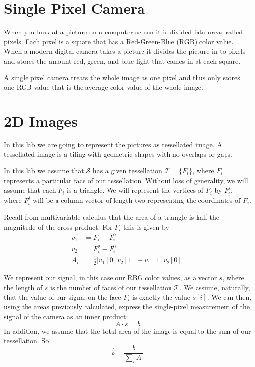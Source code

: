 \label{lab:SPC}


\section*{Single Pixel Camera}
When you look at a picture on a computer screen it is divided into areas called pixels. Each pixel is a square that has a Red-Green-Blue (RGB) color value. When a  modern digital camera takes a picture it divides the picture in to pixels and stores the amount red, green, and blue light that comes in at each square.

A single pixel camera treats the whole image as one pixel and thus only stores one RGB value that is the average color value of the whole image.  

\section*{2D Images}
In this lab we are going to represent the pictures as tessellated image. A tessellated image is a tiling with geometric shapes with no overlaps or gaps. 

In this lab we assume that $\mathcal{S}$ has a given tessellation $\mathcal{T} = \{F_i\}$, where $F_i$ represents a particular face of our tessellation. Without loss of generality, we will assume that each $F_i$ is a triangle. We will represent the vertices of $F_i$ by $F^j_i$, where $F^j_i$ will be a column vector of length two representing the coordinates of $F_i$.

Recall from multivariable calculus that the area of a triangle is half the magnitude of the cross product. For $F_i$ this is given by
\begin{align}
v_1 &= F_i^1 - F_i^0 \\
v_2 &= F_i^2 - F_i^0 \\
A_i &= \frac{1}{2}\big|v_1[0] v_2[1] - v_1[1] v_2[0]\big|
\end{align}


We represent our signal, in this case our RBG color values, as a vector $s$, where the length of $s$ is the number of faces of our tessellation $\mathcal{T}$. We assume, naturally, that the value of our signal  on the face $F_i$ is exactly the value $s[i]$. We can then, using the areas previously calculated, express the single-pixel measurement of the signal of the camera as an inner product:
\begin{equation}
A \cdot s = b
\end{equation}
In addition, we assume that the total area of the image is equal to the sum of our tessellation. So  
\begin{equation}
\hat{b} = \frac{b}{\sum_i A_i}
\end{equation}

